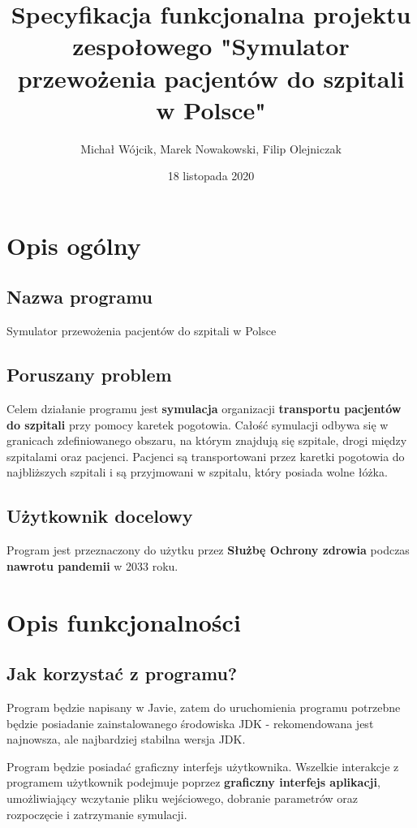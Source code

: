 \documentclass{article}
\title{Specyfikacja funkcjonalna projektu zespołowego "Symulator przewożenia pacjentów do szpitali w Polsce"}
\author{Michał Wójcik, Marek Nowakowski, Filip Olejniczak}
\date{18 listopada 2020}
\begin{document}
\maketitle

\tableofcontents
\pagebreak

\section{Opis ogólny}
    \subsection{Nazwa programu}
        Symulator przewożenia pacjentów do szpitali w Polsce

    \subsection{Poruszany problem}
        Celem działanie programu jest \textbf{symulacja} organizacji \textbf{transportu pacjentów do szpitali} przy pomocy karetek pogotowia. Całość symulacji odbywa się w granicach zdefiniowanego obszaru, na którym znajdują się szpitale, drogi między szpitalami oraz pacjenci. Pacjenci są transportowani przez karetki pogotowia do najbliższych szpitali i są przyjmowani w szpitalu, który posiada wolne łóżka.

    \subsection{Użytkownik docelowy}
        Program jest przeznaczony do użytku przez \textbf{Służbę Ochrony zdrowia} podczas \textbf{nawrotu pandemii} w 2033 roku.

\section{Opis funkcjonalności}

    \subsection{Jak korzystać z programu?}
    Program będzie napisany w Javie, zatem do uruchomienia programu potrzebne będzie posiadanie zainstalowanego środowiska JDK - rekomendowana jest najnowsza, ale najbardziej stabilna wersja JDK.

    Program będzie posiadać graficzny interfejs użytkownika. Wszelkie interakcje z programem użytkownik podejmuje poprzez \textbf{graficzny interfejs aplikacji}, umożliwiający wczytanie pliku wejściowego, dobranie parametrów oraz rozpoczęcie i zatrzymanie symulacji.
\end{document}
